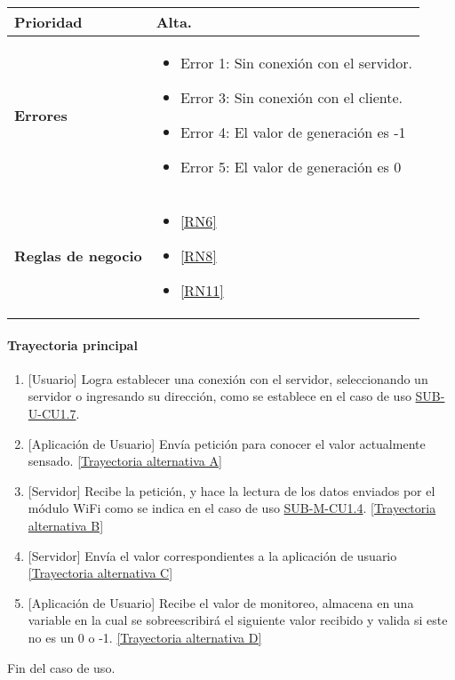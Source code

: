 \begin{longtable}{|J{5cm}|J{10.3cm}|}
	\textbf{Prioridad} & 
		Alta. \\ \hline
	\textbf{Errores} & 
		\begin{itemize}
		    \item \label{CU5:Error1} Error 1: Sin conexión con el servidor.
		    \item \label{CU5:Error2} Error 3: Sin conexión con el cliente.
		    \item \label{CU5:Error3} Error 4: El valor de generación es -1
		    \item \label{CU5:Error4} Error 5: El valor de generación es 0
		\end{itemize} \\ \hline
	\textbf{Reglas de negocio} & 
		\begin{itemize}
		    \item \ref{RN6}
			\item \ref{RN8}
			\item \ref{RN11}
		\end{itemize} \\ \hline
\end{longtable}

\paragraph{Trayectoria principal}\label{SUB-U-CU1.12:TPr}
    \label{SUB-U-CU1.5:TP}
	\begin{enumerate}
	    \item {[Usuario]} Logra establecer una conexión con el servidor, seleccionando un servidor o ingresando su dirección, como se establece en el caso de uso \hyperref[SUB-U-CU1.7]{SUB-U-CU1.7}.
	    \item {[Aplicación de Usuario]} Envía petición para conocer el valor actualmente sensado. \hyperref[SUB-U-CU1.5:TA]{[Trayectoria alternativa A]} 
	    \item {[Servidor]} Recibe la petición, y hace la lectura de los datos enviados por el módulo WiFi como se indica en el caso de uso  \hyperref[SUB-M-CU1.4]{SUB-M-CU1.4}. \hyperref[SUB-U-CU1.5:TB]{[Trayectoria alternativa B]}
	    \item {[Servidor]} Envía el valor correspondientes a la aplicación de usuario \hyperref[SUB-U-CU1.5:TC]{[Trayectoria alternativa C]} 
	    \item {[Aplicación de Usuario]} Recibe el valor de monitoreo, almacena en una variable en la cual se sobreescribirá el siguiente valor recibido y valida si este no es un 0 o -1. \hyperref[SUB-U-CU1.5:TD]{[Trayectoria alternativa D]}
	\end{enumerate}
	Fin del caso de uso.


